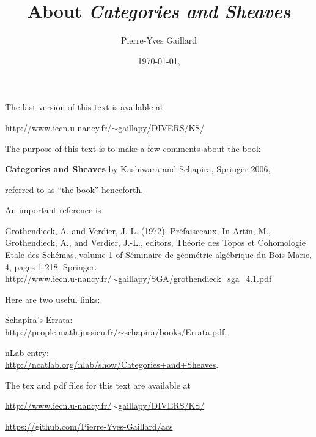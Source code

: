 \documentclass[12pt]{article}
\title{About \em{Categories and Sheaves}}
\author{Pierre-Yves Gaillard}
\date{\today, \currenttime}
\theoremstyle{remark}%
\newcommand{\n}{\noindent}
\begin{document}
\maketitle

\n The last version of this text is available at

\n\href{http://www.iecn.u-nancy.fr/~gaillapy/DIVERS/KS/}{http://www.iecn.u-nancy.fr/$\sim$gaillapy/DIVERS/KS/}

\tableofcontents\newpage%

\n The purpose of this text is to make a few comments about the book%

\textbf{Categories and Sheaves} by Kashiwara and Schapira, Springer 2006,%

\n referred to as ``the book'' henceforth.%

An important reference is

\n[GV] Grothendieck, A. and Verdier, J.-L. (1972). Pr\'efaisceaux. In Artin, M., Grothendieck, A., and Verdier, J.-L., editors, Th\'eorie des Topos et Cohomologie Etale des Sch\'emas, volume 1 of S\'eminaire de g\'eom\'etrie alg\'ebrique du Bois-Marie, 4, pages 1-218. Springer. \\ 
\n\href{http://www.iecn.u-nancy.fr/~gaillapy/SGA/grothendieck_sga_4.1.pdf}{http://www.iecn.u-nancy.fr/$\sim$gaillapy/SGA/grothendieck\_sga\_4.1.pdf} 

Here are two useful links:

\n Schapira's Errata:\\ \href{http://people.math.jussieu.fr/~schapira/books/Errata.pdf}{http://people.math.jussieu.fr/$\sim$schapira/books/Errata.pdf},

\n nLab entry:\\ \href{http://ncatlab.org/nlab/show/Categories+and+Sheaves}{http://ncatlab.org/nlab/show/Categories+and+Sheaves}. 

The tex and pdf files for this text are available at 
 
\n\href{http://www.iecn.u-nancy.fr/~gaillapy/DIVERS/KS/}{http://www.iecn.u-nancy.fr/$\sim$gaillapy/DIVERS/KS/} 
 
 

\n\href{https://github.com/Pierre-Yves-Gaillard/acs}{https://github.com/Pierre-Yves-Gaillard/acs} 
\end{document}

